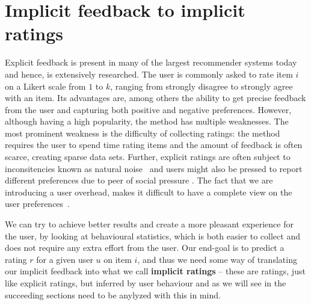




\label{implicit-feedback}
\section{Implicit feedback to implicit ratings}
\label{sec:implicit}


Explicit feedback is present in many of the largest recommender systems today
and hence, is extensively researched. The user is commonly asked to
rate item $i$ on a Likert scale from $1$ to $k$, ranging from strongly
disagree to strongly agree with an item. Its advantages are, among others the
ability to get precise feedback from the user and capturing both positive and
negative preferences. However, although having a high popularity, the method
has multiple weaknesses. The most prominent weakness is the difficulty of
collecting ratings: the method requires the user to spend time rating items and
the amount of feedback is often scarce, creating sparse data sets. Further,
explicit ratings are often subject to inconsitencies known as natural
noise~\cite{amatriain2009like} and users might also be pressed to report
different preferences due to peer of social pressure . The fact that we are
introducing a user overhead, makes it difficult to have a complete view on the
user preferences~\cite{Jawaheer2010}.

We can try to achieve better results and create a more pleasant experience for
the user, by looking at behavioural statistics, which is both easier to collect
and does not require any extra effort from the user. Our end-goal is to predict
a rating $r$ for a given user $u$ on item $i$, and thus we need some way of
translating our implicit feedback into what we call \textbf{implicit ratings} –
these are ratings, just like explicit ratings, but inferred by user behaviour
and as we will see in the succeeding sections need to be anylyzed with this in
mind.

